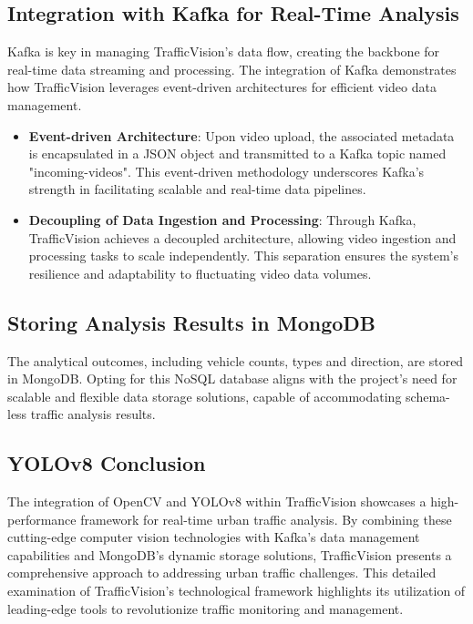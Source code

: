 \subsection{Integration with Kafka for Real-Time Analysis}
Kafka\cite{kreps2011kafka} is key in managing TrafficVision's data flow, creating the backbone for real-time data streaming and processing. The integration of Kafka demonstrates how TrafficVision leverages event-driven architectures for efficient video data management.
\begin{itemize}
    \item \textbf{Event-driven Architecture}: Upon video upload, the associated metadata is encapsulated in a JSON object and transmitted to a Kafka topic named "incoming-videos". This event-driven methodology underscores Kafka's strength in facilitating scalable and real-time data pipelines.

    \item \textbf{Decoupling of Data Ingestion and Processing}: Through Kafka, TrafficVision achieves a decoupled architecture, allowing video ingestion and processing tasks to scale independently. This separation ensures the system's resilience and adaptability to fluctuating video data volumes.
\end{itemize}

\subsection{Storing Analysis Results in MongoDB}
The analytical outcomes, including vehicle counts, types and direction, are stored in MongoDB. Opting for this NoSQL database aligns with the project's need for scalable and flexible data storage solutions, capable of accommodating schema-less traffic analysis results.

\subsection{YOLOv8 Conclusion}
The integration of OpenCV and YOLOv8 within TrafficVision showcases a high-performance framework for real-time urban traffic analysis. By combining these cutting-edge computer vision technologies with Kafka's data management capabilities and MongoDB's dynamic storage solutions, TrafficVision presents a comprehensive approach to addressing urban traffic challenges. This detailed examination of TrafficVision's technological framework highlights its utilization of leading-edge tools to revolutionize traffic monitoring and management.

